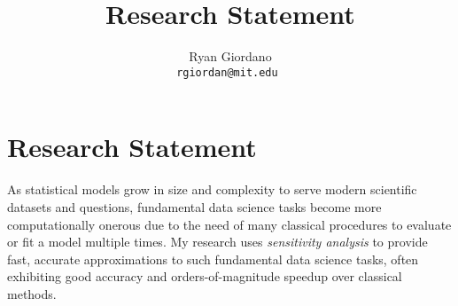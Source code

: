 

\usepackage{enumitem}

\title{Research Statement}

\author{
  Ryan Giordano \\ \texttt{rgiordan@mit.edu }
}



\section*{Research Statement}

As statistical models grow in size and complexity to serve modern scientific
datasets and questions, fundamental data science tasks become more
computationally onerous due to the need of many classical procedures to evaluate
or fit a model multiple times.  My research uses {\em sensitivity analysis} to
provide fast, accurate approximations to such fundamental data science tasks,
often exhibiting good accuracy and orders-of-magnitude speedup over classical
methods.

